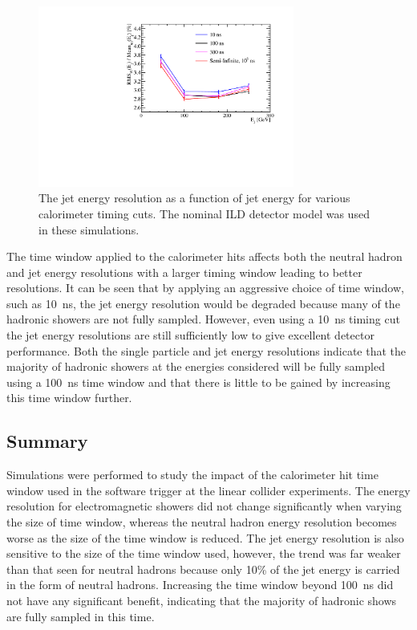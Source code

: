 \begin{figure}[h!]
\includegraphics[width=0.75\textwidth]{EnergyEstimators/Plots/TimingCuts/JER_vs_JetEnergy_TimingCutStudies.pdf}
\caption[The jet energy resolution as a function of jet energy for various calorimeter timing cuts.  The nominal ILD detector model was used in these simulations.]{The jet energy resolution as a function of jet energy for various calorimeter timing cuts.  The nominal ILD detector model was used in these simulations.}
\label{fig:jertimingcuts}
\end{figure}

The time window applied to the calorimeter hits affects both the neutral hadron and jet energy resolutions with a larger timing window leading to better resolutions.  It can be seen that by applying an aggressive choice of time window, such as 10~ns, the jet energy resolution would be degraded because many of the hadronic showers are not fully sampled.  However, even using a 10~ns timing cut the jet energy resolutions are still sufficiently low to give excellent detector performance.  Both the single particle and jet energy resolutions indicate that the majority of hadronic showers at the energies considered will be fully sampled using a 100~ns time window and that there is little to be gained by increasing this time window further.


\subsection{Summary}
Simulations were performed to study the impact of the calorimeter hit time window used in the software trigger at the linear collider experiments.  The energy resolution for electromagnetic showers did not change significantly when varying the size of time window, whereas the neutral hadron energy resolution becomes worse as the size of the time window is reduced.  The jet energy resolution is also sensitive to the size of the time window used, however, the trend was far weaker than that seen for neutral hadrons because only 10\% of the jet energy is carried in the form of neutral hadrons.  Increasing the time window beyond 100~ns did not have any significant benefit, indicating that the majority of hadronic shows are fully sampled in this time.   

